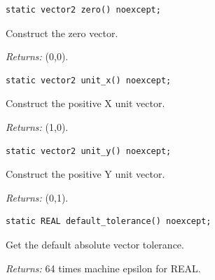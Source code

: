 \par\noindent\begin{minipage}{\linewidth}
\begin{lstlisting}[style=apireference]
static vector2 zero() noexcept;
\end{lstlisting}
{\footnotesize Construct the zero vector.\par}
{\footnotesize\textit{Returns:} (0,0).\par}
\end{minipage}\par\vspace{1pt}
\par\noindent\begin{minipage}{\linewidth}
\begin{lstlisting}[style=apireference]
static vector2 unit_x() noexcept;
\end{lstlisting}
{\footnotesize Construct the positive X unit vector.\par}
{\footnotesize\textit{Returns:} (1,0).\par}
\end{minipage}\par\vspace{1pt}
\par\noindent\begin{minipage}{\linewidth}
\begin{lstlisting}[style=apireference]
static vector2 unit_y() noexcept;
\end{lstlisting}
{\footnotesize Construct the positive Y unit vector.\par}
{\footnotesize\textit{Returns:} (0,1).\par}
\end{minipage}\par\vspace{1pt}
\par\noindent\begin{minipage}{\linewidth}
\begin{lstlisting}[style=apireference]
static REAL default_tolerance() noexcept;
\end{lstlisting}
{\footnotesize Get the default absolute vector tolerance.\par}
{\footnotesize\textit{Returns:} 64 times machine epsilon for REAL.\par}
\end{minipage}\par\vspace{1pt}
